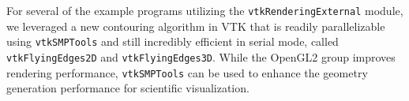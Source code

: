 For several of the example programs utilizing the \texttt{vtkRenderingExternal} module, we leveraged a new contouring algorithm in VTK that is readily parallelizable using \texttt{vtkSMPTools} and still incredibly efficient in serial mode, called \texttt{vtkFlyingEdges2D} and \texttt{vtkFlyingEdges3D}.
While the OpenGL2 group improves rendering performance, \texttt{vtkSMPTools} can be used to enhance the geometry generation performance for scientific visualization.

